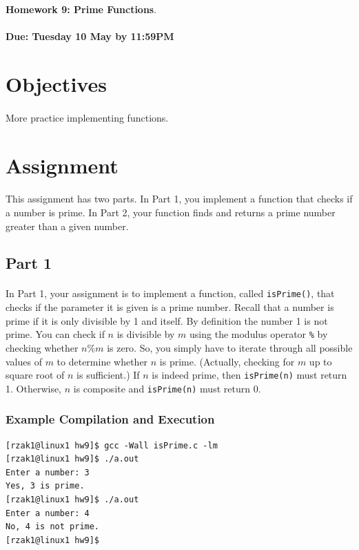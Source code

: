 \documentclass[letter,11pt]{article}
\begin{document}
\huge
\textbf{Homework 9: Prime Functions}.
\normalsize
\\ ~~ \\
\textbf{Due: Tuesday 10 May by 11:59PM}

\section*{Objectives}
\paragraph{}More practice implementing functions.

\section*{Assignment}
\paragraph{}This assignment has two parts. In Part 1, you implement a function that checks if a number is prime. In Part 2, your function finds and returns a prime number greater than a given number.

\subsection*{Part 1}
\paragraph{}In Part 1, your assignment is to implement a function, called \texttt{isPrime()}, that checks if the parameter it is given is a prime number. Recall that a number is prime if it is only divisible by 1 and itself. By definition the number 1 is not prime. You can check if $n$ is divisible by $m$ using the modulus operator \texttt{\%} by checking whether $n \% m$ is zero. So, you simply have to iterate through all possible values of $m$ to determine whether $n$ is prime. (Actually, checking for $m$ up to square root of $n$ is sufficient.) If $n$ is indeed prime, then \texttt{isPrime(n)} must return 1. Otherwise, $n$ is composite and \texttt{isPrime(n)} must return 0.

\subsubsection*{Example Compilation and Execution}
\begin{verbatim}
[rzak1@linux1 hw9]$ gcc -Wall isPrime.c -lm
[rzak1@linux1 hw9]$ ./a.out
Enter a number: 3
Yes, 3 is prime.
[rzak1@linux1 hw9]$ ./a.out
Enter a number: 4
No, 4 is not prime.
[rzak1@linux1 hw9]$
\end{verbatim}
\end{document}
